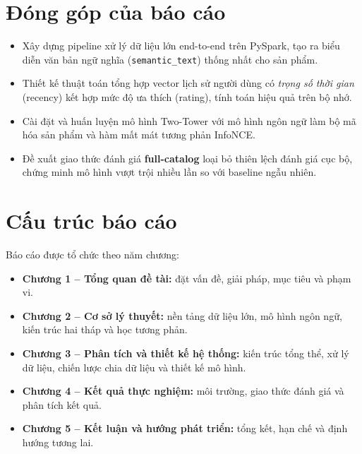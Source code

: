 \section{Đóng góp của báo cáo}

\begin{itemize}[leftmargin=2em, itemsep=2pt]
    \item Xây dựng pipeline xử lý dữ liệu lớn end-to-end trên PySpark, tạo ra biểu
    diễn văn bản ngữ nghĩa (\texttt{semantic\_text}) thống nhất cho sản phẩm.
    \item Thiết kế thuật toán tổng hợp vector lịch sử người dùng có \textit{trọng số
    thời gian} (recency) kết hợp mức độ ưa thích (rating), tính toán hiệu quả trên
    bộ nhớ.
    \item Cài đặt và huấn luyện mô hình Two-Tower với mô hình ngôn ngữ làm bộ mã hóa
    sản phẩm và hàm mất mát tương phản InfoNCE.
    \item Đề xuất giao thức đánh giá \textbf{full-catalog} loại bỏ thiên lệch đánh
    giá cục bộ, chứng minh mô hình vượt trội nhiều lần so với baseline ngẫu nhiên.
\end{itemize}

\section{Cấu trúc báo cáo}

Báo cáo được tổ chức theo năm chương:

\begin{itemize}[leftmargin=2em, itemsep=2pt]
    \item \textbf{Chương 1 -- Tổng quan đề tài:} đặt vấn đề, giải pháp, mục tiêu và
    phạm vi.
    \item \textbf{Chương 2 -- Cơ sở lý thuyết:} nền tảng dữ liệu lớn, mô hình ngôn
    ngữ, kiến trúc hai tháp và học tương phản.
    \item \textbf{Chương 3 -- Phân tích và thiết kế hệ thống:} kiến trúc tổng thể,
    xử lý dữ liệu, chiến lược chia dữ liệu và thiết kế mô hình.
    \item \textbf{Chương 4 -- Kết quả thực nghiệm:} môi trường, giao thức đánh giá
    và phân tích kết quả.
    \item \textbf{Chương 5 -- Kết luận và hướng phát triển:} tổng kết, hạn chế và
    định hướng tương lai.
\end{itemize}

